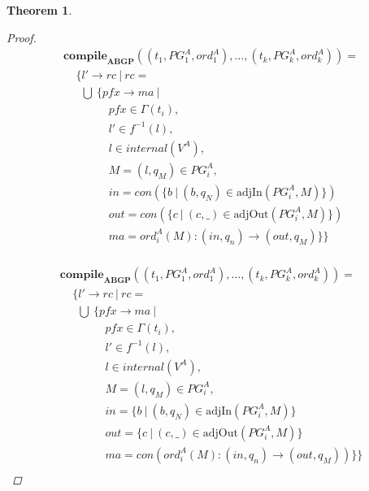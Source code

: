 \documentclass[twocolumn]{sig-alternate-10pt}
\newtheorem{thm}{Theorem}[section]
\begin{document}
\begin{thm}
\begin{proof}
  \[ \begin{array}{l}
     \textbf{compile}_\textbf{ABGP}( (t_1,PG^A_1,ord^A_1), \dots, (t_k,PG^A_k,ord^A_k) ) = \\
     ~~~~~ \{ l' \rightarrow rc ~\vert~ rc = \\
     ~~~~~~~ \bigcup~ \{ pfx \rightarrow ma ~\vert~ \\
     ~~~~~~~~~~~~~~~~~~ pfx \in \Gamma(t_i), \\
     ~~~~~~~~~~~~~~~~~~ l' \in f^{-1}(l), \\
     ~~~~~~~~~~~~~~~~~~ l \in internal(V^A), \\
     ~~~~~~~~~~~~~~~~~~ M = (l,q_M) \in PG^A_i, \\
     ~~~~~~~~~~~~~~~~~~ in = con(\{ b ~\vert~ (b,q_N) \in \text{adjIn}(PG^A_i,M) \}) \\
     ~~~~~~~~~~~~~~~~~~ out = con(\{ c ~\vert~ (c,\_) \in \text{adjOut}(PG^A_i,M) \}) \\
     ~~~~~~~~~~~~~~~~~~ ma = ord^A_i(M) : (in,q_n) \rightarrow (out,q_M) \} \} \\
  \end{array} \]%

  \[ \begin{array}{l}
     \textbf{compile}_\textbf{ABGP}( (t_1,PG^A_1,ord^A_1), \dots, (t_k,PG^A_k,ord^A_k) ) = \\
     ~~~~~ \{ l' \rightarrow rc ~\vert~ rc = \\
     ~~~~~~~ \bigcup~ \{ pfx \rightarrow ma ~\vert~ \\
     ~~~~~~~~~~~~~~~~~~ pfx \in \Gamma(t_i), \\
     ~~~~~~~~~~~~~~~~~~ l' \in f^{-1}(l), \\
     ~~~~~~~~~~~~~~~~~~ l \in internal(V^A), \\
     ~~~~~~~~~~~~~~~~~~ M = (l,q_M) \in PG^A_i, \\
     ~~~~~~~~~~~~~~~~~~ in = \{ b ~\vert~ (b,q_N) \in \text{adjIn}(PG^A_i,M) \} \\
     ~~~~~~~~~~~~~~~~~~ out = \{ c ~\vert~ (c,\_) \in \text{adjOut}(PG^A_i,M) \} \\
     ~~~~~~~~~~~~~~~~~~ ma = con(ord^A_i(M) : (in,q_n) \rightarrow (out,q_M)) \} \} \\
  \end{array} \]%


\end{proof}
\end{thm}
\end{document}
